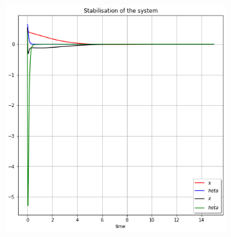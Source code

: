 \documentclass[a4paper,11pt]{article}
\theoremstyle{mytheor}
\begin{document}
\includegraphics[width=10cm, height=10cm]{G.png}
\end{document}
